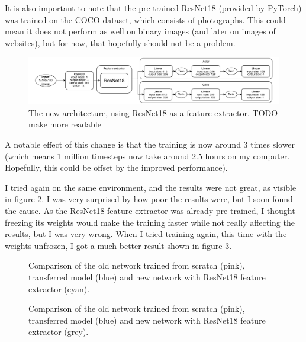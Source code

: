 \documentclass[
  digital,     %
  oneside,     %
  nosansbold,  %
  nocolorbold, %
  lof,         %
  lot,         %
]{fithesis4}
\begin{document}
It is also important to note that the pre-trained ResNet18 (provided by PyTorch) was trained on the COCO dataset, which consists of photographs. This could mean it does not perform as well on binary images (and later on images of websites), but for now, that hopefully should not be a problem.

\begin{figure}
    \centering
    \includegraphics[width=1\linewidth]{diagrams/resnet_policy.pdf}
    \caption{The new architecture, using ResNet18 as a feature extractor. TODO make more readable}
    \label{fig:resnet_policy}
\end{figure}

A notable effect of this change is that the training is now around 3 times slower (which means 1 million timesteps now take around 2.5 hours on my computer. Hopefully, this could be offset by the improved performance).

I tried again on the same environment, and the results were not great, as visible in figure \ref{fig:v4_resnet_frozen}. I was very surprised by how poor the results were, but I soon found the cause. As the ResNet18 feature extractor was already pre-trained, I thought freezing its weights would make the training faster while not really affecting the results, but I was very wrong. When I tried training again, this time with the weights unfrozen, I got a much better result shown in figure \ref{fig:v4_resnet_finetune}.

\begin{figure}
    \centering
    \makebox[\textwidth][c]{}
    \caption{Comparison of the old network trained from scratch (pink), transferred model (blue) and new network with ResNet18 feature extractor (cyan).}
    \label{fig:v4_resnet_frozen}
\end{figure}

\begin{figure}
    \centering
    \makebox[\textwidth][c]{}
    \caption{Comparison of the old network trained from scratch (pink), transferred model (blue) and new network with ResNet18 feature extractor (grey).}
    \label{fig:v4_resnet_finetune}
\end{figure}
\end{document}
